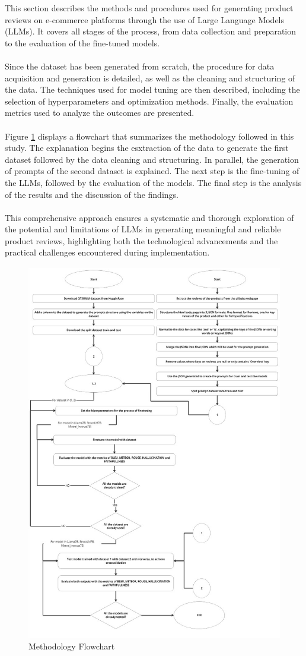 This section describes the methods and procedures used for generating product reviews on e-commerce platforms through the use of Large Language Models (LLMs). It covers all stages of the process, from data collection and preparation to the evaluation of the fine-tuned models.
\\\\
Since the dataset has been generated from scratch, the procedure for data acquisition and generation is detailed, as well as the cleaning and structuring of the data. The techniques used for model tuning are then described, including the selection of hyperparameters and optimization methods. Finally, the evaluation metrics used to analyze the outcomes are presented.
\\\\
Figure \ref{fig:MethodologyFlowchart} displays a flowchart that summarizes the methodology followed in this study. The explanation begins the esxtraction of the data to generate the first dataset followed by the data cleaning and structuring. In parallel, the generation of prompts of the second dataset is explained. The next step is the fine-tuning of the LLMs, followed by the evaluation of the models. The final step is the analysis of the results and the discussion of the findings.
\\\\
This comprehensive approach ensures a systematic and thorough exploration of the potential and limitations of LLMs in generating meaningful and reliable product reviews, highlighting both the technological advancements and the practical challenges encountered during implementation.
\begin{figure}[H]
    \centering
    \includegraphics[width=13cm]{images/Methodology.jpg}
    \caption{Methodology Flowchart}
    \label{fig:MethodologyFlowchart}
\end{figure}
